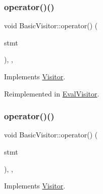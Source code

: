 \subsubsection{\texorpdfstring{operator()()}{operator()()}\hspace{0.1cm}{\footnotesize\ttfamily [27/60]}}
{\footnotesize\ttfamily void Basic\+Visitor\+::operator() (\begin{DoxyParamCaption}\item[{const \hyperlink{struct_expression_statement}{Expression\+Statement} \&}]{stmt }\end{DoxyParamCaption})\hspace{0.3cm}{\ttfamily [inline]}, {\ttfamily [override]}, {\ttfamily [virtual]}}



Implements \hyperlink{struct_visitor_a319554fbb3f24e664a86ef7839201040}{Visitor}.



Reimplemented in \hyperlink{class_eval_visitor_a7122ac9fb6f1ef01696296b6bd2edbeb}{Eval\+Visitor}.

\mbox{\label{struct_basic_visitor_a4d4e3621e47ea469c0e59d0b1c6c657b}} 
\subsubsection{\texorpdfstring{operator()()}{operator()()}\hspace{0.1cm}{\footnotesize\ttfamily [28/60]}}
{\footnotesize\ttfamily void Basic\+Visitor\+::operator() (\begin{DoxyParamCaption}\item[{const \hyperlink{struct_if_statement}{If\+Statement} \&}]{stmt }\end{DoxyParamCaption})\hspace{0.3cm}{\ttfamily [inline]}, {\ttfamily [override]}, {\ttfamily [virtual]}}



Implements \hyperlink{struct_visitor_a9d30bc5ad73a274f7533df4b5a65ae41}{Visitor}.

\mbox{\label{struct_basic_visitor_a51de918d2508db22dba21233582f670e}} 
